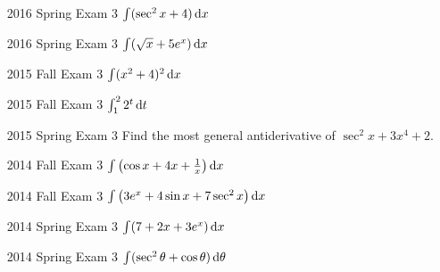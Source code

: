 \documentclass[10pt]{scrartcl}
\theoremstyle{definition}
\begin{document}
\begin{enumerate}
\item [2016 Spring Exam 3] $\int (\sec^2 x + 4) \dif x$
\item [2016 Spring Exam 3] $\int (\sqrt x + 5e^x) \dif x$
\item [2015 Fall Exam 3] $\int (x^2 + 4)^2 \dif x$
\item [2015 Fall Exam 3] $\int_1^2 2^t \dif t$
\item [2015 Spring Exam 3] Find the most general antiderivative of $\sec^2 x + 3x^4 + 2$.
\item [2014 Fall Exam 3] $\int \left( \cos x + 4x + \frac{1}{x} \right) \dif x$
\item [2014 Fall Exam 3] $\int \left( 3e^x + 4\sin x + 7\sec^2 x \right) \dif x$
\item [2014 Spring Exam 3] $\int (7 + 2x + 3e^x) \dif x$
\item [2014 Spring Exam 3] $\int (\sec^2 \theta + \cos \theta) \dif \theta$
\end{enumerate}
\end{document}
